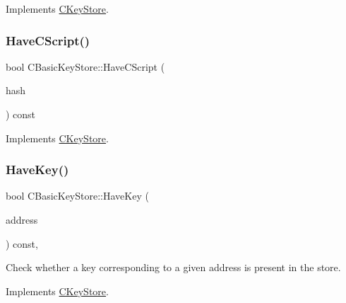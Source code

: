 Implements \mbox{\hyperlink{class_c_key_store_a812534268d0324370c53ba3e7a295b95}{C\+Key\+Store}}.

\mbox{\label{class_c_basic_key_store_a499e0a1d117b43e3200883d88a400bf6}} 
\subsubsection{\texorpdfstring{Have\+C\+Script()}{HaveCScript()}}
{\footnotesize\ttfamily bool C\+Basic\+Key\+Store\+::\+Have\+C\+Script (\begin{DoxyParamCaption}\item[{const C\+Script\+ID \&}]{hash }\end{DoxyParamCaption}) const\hspace{0.3cm}{\ttfamily [virtual]}}



Implements \mbox{\hyperlink{class_c_key_store_a51c9fc86b2c3fece10d86146231fa58d}{C\+Key\+Store}}.

\mbox{\label{class_c_basic_key_store_afc99762e3e58f93e198d85ecfdf5804a}} 
\subsubsection{\texorpdfstring{Have\+Key()}{HaveKey()}}
{\footnotesize\ttfamily bool C\+Basic\+Key\+Store\+::\+Have\+Key (\begin{DoxyParamCaption}\item[{const \mbox{\hyperlink{class_c_key_i_d}{C\+Key\+ID}} \&}]{address }\end{DoxyParamCaption}) const\hspace{0.3cm}{\ttfamily [inline]}, {\ttfamily [virtual]}}



Check whether a key corresponding to a given address is present in the store. 



Implements \mbox{\hyperlink{class_c_key_store_a9398451d4270fae27b29f686a9d43a65}{C\+Key\+Store}}.

\mbox{\label{class_c_basic_key_store_a513367bd0a576e088e3f577686fa1ef5}} 

